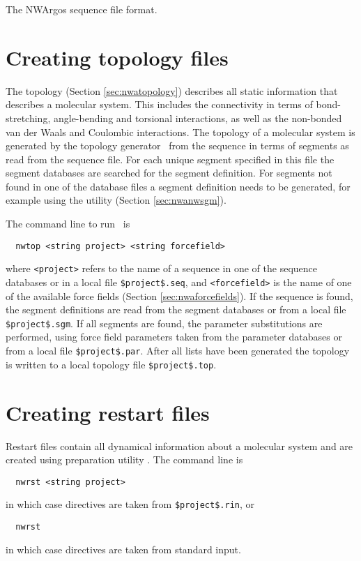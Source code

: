 \begin{table}[htbp]
\caption{The NWArgos sequence file format.}
\end{table}

\section{Creating topology files}
\label{sec:nwanwtop}

The topology (Section \ref{sec:nwatopology}) describes all static information
that describes a molecular system. This includes the connectivity in
terms of bond-stretching, angle-bending and torsional interactions, as well as
the non-bonded van der Waals and Coulombic interactions.
The topology of a molecular system is generated by the topology
generator \nwtop\ from the sequence in terms of segments as read from
the sequence file. For each unique segment specified in this file the 
segment databases are searched for the segment definition. For
segments not found in one of the database files a segment definition
needs to be generated, for example using the utility \nwsgm (Section \ref{sec:nwanwsgm}).

The command line to run \nwtop\ is
\begin{verbatim}
  nwtop <string project> <string forcefield>
\end{verbatim}
where \verb+<project>+ refers to the name of a sequence in one of the
sequence databases or in a local file \verb+$project$.seq+, and
\verb+<forcefield>+ is the name of one of the available force fields 
(Section \ref{sec:nwaforcefields}).
If the sequence is found, the segment definitions are read from the
segment databases or from a local file \verb+$project$.sgm+. If all
segments are found, the parameter substitutions are performed, using
force field parameters taken from the parameter databases or from a 
local file \verb+$project$.par+. After all lists have been generated the
topology is written to a local topology file \verb+$project$.top+.

\section{Creating restart files}
\label{sec:nwanwrst}
Restart files contain all dynamical information about a molecular
system and are created using preparation utility \nwrst. The command
line is
\begin{verbatim}
  nwrst <string project>
\end{verbatim}
in which case directives are taken from \verb+$project$.rin+, or
\begin{verbatim}
  nwrst
\end{verbatim}
in which case directives are taken from standard input.

